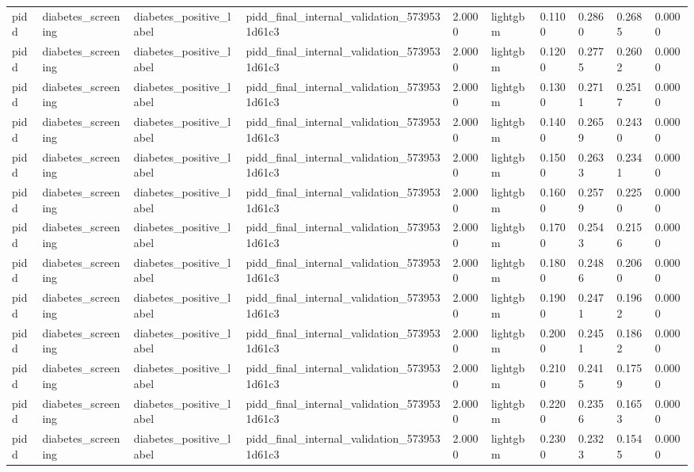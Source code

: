 \begin{tabular}{llllllllll}
pidd & diabetes\_screening & diabetes\_positive\_label & pidd\_final\_internal\_validation\_5739531d61c3 & 2.0000 & lightgbm & 0.1100 & 0.2860 & 0.2685 & 0.0000 \\
pidd & diabetes\_screening & diabetes\_positive\_label & pidd\_final\_internal\_validation\_5739531d61c3 & 2.0000 & lightgbm & 0.1200 & 0.2775 & 0.2602 & 0.0000 \\
pidd & diabetes\_screening & diabetes\_positive\_label & pidd\_final\_internal\_validation\_5739531d61c3 & 2.0000 & lightgbm & 0.1300 & 0.2711 & 0.2517 & 0.0000 \\
pidd & diabetes\_screening & diabetes\_positive\_label & pidd\_final\_internal\_validation\_5739531d61c3 & 2.0000 & lightgbm & 0.1400 & 0.2659 & 0.2430 & 0.0000 \\
pidd & diabetes\_screening & diabetes\_positive\_label & pidd\_final\_internal\_validation\_5739531d61c3 & 2.0000 & lightgbm & 0.1500 & 0.2633 & 0.2341 & 0.0000 \\
pidd & diabetes\_screening & diabetes\_positive\_label & pidd\_final\_internal\_validation\_5739531d61c3 & 2.0000 & lightgbm & 0.1600 & 0.2579 & 0.2250 & 0.0000 \\
pidd & diabetes\_screening & diabetes\_positive\_label & pidd\_final\_internal\_validation\_5739531d61c3 & 2.0000 & lightgbm & 0.1700 & 0.2543 & 0.2156 & 0.0000 \\
pidd & diabetes\_screening & diabetes\_positive\_label & pidd\_final\_internal\_validation\_5739531d61c3 & 2.0000 & lightgbm & 0.1800 & 0.2486 & 0.2060 & 0.0000 \\
pidd & diabetes\_screening & diabetes\_positive\_label & pidd\_final\_internal\_validation\_5739531d61c3 & 2.0000 & lightgbm & 0.1900 & 0.2471 & 0.1962 & 0.0000 \\
pidd & diabetes\_screening & diabetes\_positive\_label & pidd\_final\_internal\_validation\_5739531d61c3 & 2.0000 & lightgbm & 0.2000 & 0.2451 & 0.1862 & 0.0000 \\
pidd & diabetes\_screening & diabetes\_positive\_label & pidd\_final\_internal\_validation\_5739531d61c3 & 2.0000 & lightgbm & 0.2100 & 0.2415 & 0.1759 & 0.0000 \\
pidd & diabetes\_screening & diabetes\_positive\_label & pidd\_final\_internal\_validation\_5739531d61c3 & 2.0000 & lightgbm & 0.2200 & 0.2356 & 0.1653 & 0.0000 \\
pidd & diabetes\_screening & diabetes\_positive\_label & pidd\_final\_internal\_validation\_5739531d61c3 & 2.0000 & lightgbm & 0.2300 & 0.2323 & 0.1545 & 0.0000 \\

\end{tabular}
